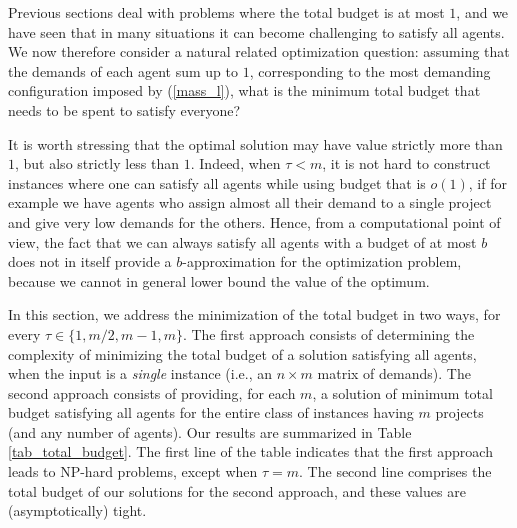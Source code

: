 \documentclass{article}
\begin{document}
Previous sections  %
deal with problems %
where the total budget is at most $1$, and we  %
have
seen that in many situations it can become challenging to satisfy all agents.
We now therefore consider a natural related optimization question: assuming
that the demands of each agent sum up to $1$, corresponding to the most demanding configuration imposed by (\ref{mass_l}), what is the minimum total budget that needs to be spent to satisfy everyone? 


It is worth stressing that %
the optimal solution may have value
strictly more than $1$, but also strictly less than $1$. Indeed, when $\tau < m$, it is not hard to construct instances where one can satisfy all agents while using budget that
is $o(1)$, if for example we have agents who assign almost all their demand to
a single project and give very low demands for the others. Hence, from a
computational point of view, the fact that we can always satisfy all agents
with a budget of at most $b$ does not in itself provide a $b$-approximation for
the optimization problem, because we cannot in general lower bound the value of
the optimum.

In this section, we address the minimization of the total budget in two ways, for every $\tau \in \{1,m/2,m-1,m\}$. The first approach consists of determining the complexity of minimizing the total budget of a solution satisfying all agents, when the input is a \emph{single} instance (i.e., an $n \times m$ matrix of demands). The second approach consists of providing, for each $m$, a solution of minimum total budget satisfying all agents for the entire class of instances having $m$ projects (and any number of agents).  %
Our results %
are summarized in Table \ref{tab_total_budget}. The first line of the table  indicates that the first approach leads to NP-hard problems, except when $\tau=m$. The second line %
comprises the total budget of our solutions for the second approach, and these values are (asymptotically) tight.  
\end{document}
